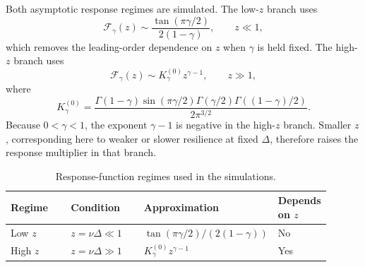 \documentclass[11pt]{article}
\newcommand{\Fresp}{\mathcal F}
\begin{document}
Both asymptotic response regimes are simulated. The low-\(z\) branch uses
\begin{equation}
 \Fresp_\gamma(z)
 \sim
 \frac{\tan(\pi\gamma/2)}{2(1-\gamma)},
 \qquad z\ll1,
 \label{eq:low-z-response}
\end{equation}
which removes the leading-order dependence on \(z\) when \(\gamma\) is held
fixed. The high-\(z\) branch uses
\begin{equation}
 \Fresp_\gamma(z)
 \sim
 K_\gamma^{(0)}z^{\gamma-1},
 \qquad z\gg1,
 \label{eq:high-z-response}
\end{equation}
where
\begin{equation}
 K_\gamma^{(0)}
 =
 \frac{
 \Gamma(1-\gamma)\sin(\pi\gamma/2)
 \Gamma(\gamma/2)\Gamma((1-\gamma)/2)
 }{2\pi^{3/2}}.
 \label{eq:k-gamma}
\end{equation}
Because \(0<\gamma<1\), the exponent \(\gamma-1\) is negative in the
high-\(z\) branch. Smaller \(z\), corresponding here to weaker or slower
resilience at fixed \(\Delta\), therefore raises the response multiplier in
that branch.

\begin{table}[ht]
\centering
\small
\caption{Response-function regimes used in the simulations.}
\label{tab:response-regimes}
\begin{tabular}{p{0.19\linewidth}p{0.23\linewidth}p{0.37\linewidth}p{0.11\linewidth}}
\toprule
Regime & Condition & Approximation & Depends on \(z\) \\
\midrule
Low \(z\) & \(z=\nu\Delta\ll1\) &
\(\tan(\pi\gamma/2)/(2(1-\gamma))\) & No \\
High \(z\) & \(z=\nu\Delta\gg1\) &
\(K_\gamma^{(0)}z^{\gamma-1}\) & Yes \\
\bottomrule
\end{tabular}
\end{table}
\end{document}
